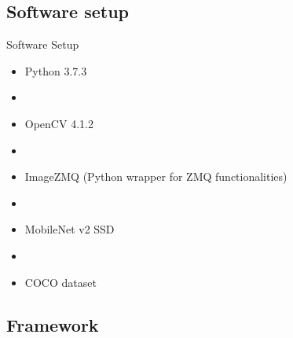 \documentclass{beamer}
\begin{document}
\subsection{Software setup}

\begin{frame}{Software Setup}
\begin{itemize}
\item Python 3.7.3
\item[]
\item OpenCV 4.1.2
\item[]
\item ImageZMQ (Python wrapper for ZMQ functionalities)
\item[]
\item MobileNet v2 SSD
\item[]
\item COCO dataset
\end{itemize}
\end{frame}

\subsection{Framework}
\end{document}
